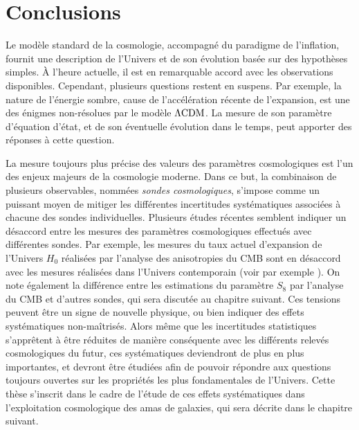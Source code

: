 \section{Conclusions}

Le modèle standard de la cosmologie, accompagné du paradigme de l'inflation, fournit une description de l'Univers et de son évolution basée sur des hypothèses simples.
À l'heure actuelle, il est en remarquable accord avec les observations disponibles.
Cependant, plusieurs questions restent en suspens.
Par exemple, la nature de l'énergie sombre, cause de l'accélération récente de l'expansion, est une des énigmes non-résolues par le modèle $\Lambda {\rm CDM}$.
La mesure de son paramètre d'équation d'état, et de son éventuelle évolution dans le temps, peut apporter des réponses à cette question.

La mesure toujours plus précise des valeurs des paramètres cosmologiques est l'un des enjeux majeurs de la cosmologie moderne.
Dans ce but, la combinaison de plusieurs observables, nommées \textit{sondes cosmologiques}, s'impose comme un puissant moyen de mitiger les différentes incertitudes systématiques associées à chacune des sondes individuelles.
Plusieurs études récentes semblent indiquer un désaccord entre les mesures des paramètres cosmologiques effectués avec différentes sondes.
Par exemple, les mesures du taux actuel d'expansion de l'Univers $H_0$ réalisées par l'analyse des anisotropies du CMB sont en désaccord avec les mesures réalisées dans l'Univers contemporain (voir par exemple \cite{riess_large_2019,wong_h0licow_2020,efstathiou_h0_2021, freedman_measurements_2021}).
On note également la différence entre les estimations du paramètre $S_8$ par l'analyse du CMB et d'autres sondes, qui sera discutée au chapitre suivant.
Ces tensions peuvent être un signe de nouvelle physique, ou bien indiquer des effets systématiques non-maîtrisés.
Alors même que les incertitudes statistiques s'apprêtent à être réduites de manière conséquente avec les différents relevés cosmologiques du futur, ces systématiques deviendront de plus en plus importantes, et devront être étudiées afin de pouvoir répondre aux questions toujours ouvertes sur les propriétés les plus fondamentales de l'Univers.
Cette thèse s'inscrit dans le cadre de l'étude de ces effets systématiques dans l'exploitation cosmologique des amas de galaxies, qui sera décrite dans le chapitre suivant.
